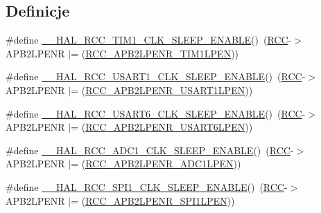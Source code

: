 \subsection*{Definicje}
\begin{DoxyCompactItemize}
\item 
\#define \hyperlink{group___r_c_c___a_p_b2___low_power___enable___disable_ga6ce02f1b2689c664010bebc2363d1db4}{\+\_\+\+\_\+\+H\+A\+L\+\_\+\+R\+C\+C\+\_\+\+T\+I\+M1\+\_\+\+C\+L\+K\+\_\+\+S\+L\+E\+E\+P\+\_\+\+E\+N\+A\+B\+LE}()~(\hyperlink{group___peripheral__declaration_ga74944438a086975793d26ae48d5882d4}{R\+CC}-\/$>$A\+P\+B2\+L\+P\+E\+NR $\vert$= (\hyperlink{group___peripheral___registers___bits___definition_ga82580245686c32761e8354fb174ba5dd}{R\+C\+C\+\_\+\+A\+P\+B2\+L\+P\+E\+N\+R\+\_\+\+T\+I\+M1\+L\+P\+EN}))
\item 
\#define \hyperlink{group___r_c_c___a_p_b2___low_power___enable___disable_ga454514918be60a95069da332eb212712}{\+\_\+\+\_\+\+H\+A\+L\+\_\+\+R\+C\+C\+\_\+\+U\+S\+A\+R\+T1\+\_\+\+C\+L\+K\+\_\+\+S\+L\+E\+E\+P\+\_\+\+E\+N\+A\+B\+LE}()~(\hyperlink{group___peripheral__declaration_ga74944438a086975793d26ae48d5882d4}{R\+CC}-\/$>$A\+P\+B2\+L\+P\+E\+NR $\vert$= (\hyperlink{group___peripheral___registers___bits___definition_gab8b429bc8d52abd1ba3818a82542bb98}{R\+C\+C\+\_\+\+A\+P\+B2\+L\+P\+E\+N\+R\+\_\+\+U\+S\+A\+R\+T1\+L\+P\+EN}))
\item 
\#define \hyperlink{group___r_c_c___a_p_b2___low_power___enable___disable_ga47fc15bdbf943a0b7164d888f1811184}{\+\_\+\+\_\+\+H\+A\+L\+\_\+\+R\+C\+C\+\_\+\+U\+S\+A\+R\+T6\+\_\+\+C\+L\+K\+\_\+\+S\+L\+E\+E\+P\+\_\+\+E\+N\+A\+B\+LE}()~(\hyperlink{group___peripheral__declaration_ga74944438a086975793d26ae48d5882d4}{R\+CC}-\/$>$A\+P\+B2\+L\+P\+E\+NR $\vert$= (\hyperlink{group___peripheral___registers___bits___definition_ga2b82eb1986da9ed32e6701d01fffe55d}{R\+C\+C\+\_\+\+A\+P\+B2\+L\+P\+E\+N\+R\+\_\+\+U\+S\+A\+R\+T6\+L\+P\+EN}))
\item 
\#define \hyperlink{group___r_c_c___a_p_b2___low_power___enable___disable_ga37931819af9a7b1a05385e0ae6c984b6}{\+\_\+\+\_\+\+H\+A\+L\+\_\+\+R\+C\+C\+\_\+\+A\+D\+C1\+\_\+\+C\+L\+K\+\_\+\+S\+L\+E\+E\+P\+\_\+\+E\+N\+A\+B\+LE}()~(\hyperlink{group___peripheral__declaration_ga74944438a086975793d26ae48d5882d4}{R\+CC}-\/$>$A\+P\+B2\+L\+P\+E\+NR $\vert$= (\hyperlink{group___peripheral___registers___bits___definition_ga126a8791f77cecc599e32d2c882a4dab}{R\+C\+C\+\_\+\+A\+P\+B2\+L\+P\+E\+N\+R\+\_\+\+A\+D\+C1\+L\+P\+EN}))
\item 
\#define \hyperlink{group___r_c_c___a_p_b2___low_power___enable___disable_ga41997855b2cc7563c8ed0c9873d32daf}{\+\_\+\+\_\+\+H\+A\+L\+\_\+\+R\+C\+C\+\_\+\+S\+P\+I1\+\_\+\+C\+L\+K\+\_\+\+S\+L\+E\+E\+P\+\_\+\+E\+N\+A\+B\+LE}()~(\hyperlink{group___peripheral__declaration_ga74944438a086975793d26ae48d5882d4}{R\+CC}-\/$>$A\+P\+B2\+L\+P\+E\+NR $\vert$= (\hyperlink{group___peripheral___registers___bits___definition_ga2c6729058e54f4b8f8ae01d5b3586aaa}{R\+C\+C\+\_\+\+A\+P\+B2\+L\+P\+E\+N\+R\+\_\+\+S\+P\+I1\+L\+P\+EN}))

\end{DoxyCompactItemize}
